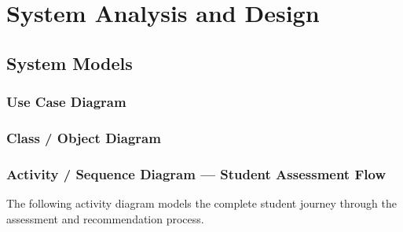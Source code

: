 ﻿\documentclass[12pt, a4paper]{article}
\begin{document}
\clearpage

\section{System Analysis and Design}

\subsection{System Models}

\subsubsection*{Use Case Diagram}



\subsubsection*{Class / Object Diagram}



\subsubsection*{Activity / Sequence Diagram --- Student Assessment Flow}

The following activity diagram models the complete student journey through the assessment and recommendation process.
\end{document}
